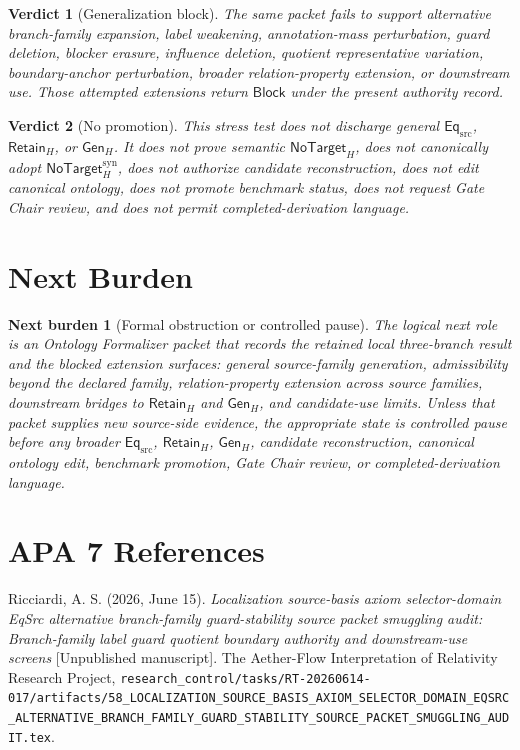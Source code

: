\documentclass[11pt]{article}
\newcommand{\EqSrc}{\mathsf{Eq}_{\mathrm{src}}}
\newcommand{\RetainH}{\mathsf{Retain}_{H}}
\newcommand{\GenH}{\mathsf{Gen}_{H}}
\newcommand{\NoTargetH}{\mathsf{NoTarget}_{H}}
\newcommand{\NoTargetSyn}{\mathsf{NoTarget}_{H}^{\mathrm{syn}}}
\newcommand{\Block}{\mathsf{Block}}
\newtheorem{verdict}{Verdict}
\newtheorem{nextburden}{Next burden}
\begin{document}
\begin{verdict}[Generalization block]
The same packet fails to support alternative branch-family expansion,
label weakening, annotation-mass perturbation, guard deletion, blocker
erasure, influence deletion, quotient representative variation,
boundary-anchor perturbation, broader relation-property extension, or
downstream use. Those attempted extensions return \(\Block\) under the
present authority record.
\end{verdict}

\begin{verdict}[No promotion]
This stress test does not discharge general \(\EqSrc\), \(\RetainH\),
or \(\GenH\). It does not prove semantic \(\NoTargetH\), does not
canonically adopt \(\NoTargetSyn\), does not authorize candidate
reconstruction, does not edit canonical ontology, does not promote
benchmark status, does not request Gate Chair review, and does not
permit completed-derivation language.
\end{verdict}

\section{Next Burden}

\begin{nextburden}[Formal obstruction or controlled pause]
The logical next role is an Ontology Formalizer packet that records the
retained local three-branch result and the blocked extension surfaces:
general source-family generation, admissibility beyond the declared
family, relation-property extension across source families, downstream
bridges to \(\RetainH\) and \(\GenH\), and candidate-use limits. Unless
that packet supplies new source-side evidence, the appropriate state is
controlled pause before any broader \(\EqSrc\), \(\RetainH\),
\(\GenH\), candidate reconstruction, canonical ontology edit, benchmark
promotion, Gate Chair review, or completed-derivation language.
\end{nextburden}

\section*{APA 7 References}

Ricciardi, A. S. (2026, June 15). \emph{Localization source-basis axiom
selector-domain EqSrc alternative branch-family guard-stability source
packet smuggling audit: Branch-family label guard quotient boundary
authority and downstream-use screens} [Unpublished manuscript]. The
Aether-Flow Interpretation of Relativity Research Project,
\texttt{research\_control/tasks/RT-20260614-017/artifacts/58\_LOCALIZATION\_SOURCE\_BASIS\_AXIOM\_SELECTOR\_DOMAIN\_EQSRC\_ALTERNATIVE\_BRANCH\_FAMILY\_GUARD\_STABILITY\_SOURCE\_PACKET\_SMUGGLING\_AUDIT.tex}.
\end{document}
